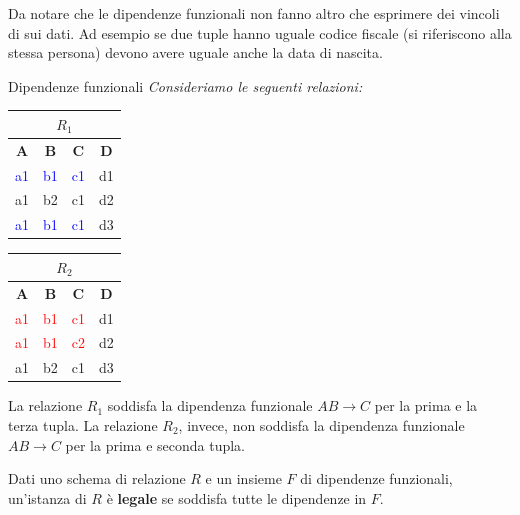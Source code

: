 Da notare che le dipendenze funzionali non fanno altro che esprimere dei vincoli di sui dati. Ad esempio se due tuple hanno uguale codice fiscale (si riferiscono alla stessa persona) devono avere uguale anche la data di nascita.

\begin{Example}{Dipendenze funzionali}{}
    \textit{Consideriamo le seguenti relazioni:}
    \begin{center}
        \begin{tabular}{|c|c|c|c|}
            \hline\multicolumn{4}{|c|}{$R_1$}\\\hline
            \textbf{A} & \textbf{B} & \textbf{C} & \textbf{D}\\\hline
            \textcolor{blue}{a1} & \textcolor{blue}{b1} & \textcolor{blue}{c1} & d1\\
            a1 & b2 & c1 & d2\\
            \textcolor{blue}{a1} & \textcolor{blue}{b1} & \textcolor{blue}{c1} & d3\\\hline
        \end{tabular}
        \begin{tabular}{|c|c|c|c|}
            \hline\multicolumn{4}{|c|}{$R_2$}\\\hline
            \textbf{A} & \textbf{B} & \textbf{C} & \textbf{D}\\\hline
            \textcolor{red}{a1} & \textcolor{red}{b1} & \textcolor{red}{c1} & d1\\
            \textcolor{red}{a1} & \textcolor{red}{b1} & \textcolor{red}{c2} & d2\\
            a1 & b2 & c1 & d3\\\hline
        \end{tabular}
    \end{center}
    La relazione $R_1$ soddisfa la dipendenza funzionale $AB\to C$ per la prima e la terza tupla. La relazione $R_2$, invece, non soddisfa la dipendenza funzionale $AB\to C$ per la prima e seconda tupla.
\end{Example}

\begin{redbar}
    Dati uno schema di relazione $R$ e un insieme $F$ di dipendenze funzionali, un'istanza di $R$ è \textbf{legale} se soddisfa tutte le dipendenze in $F$.
\end{redbar}

